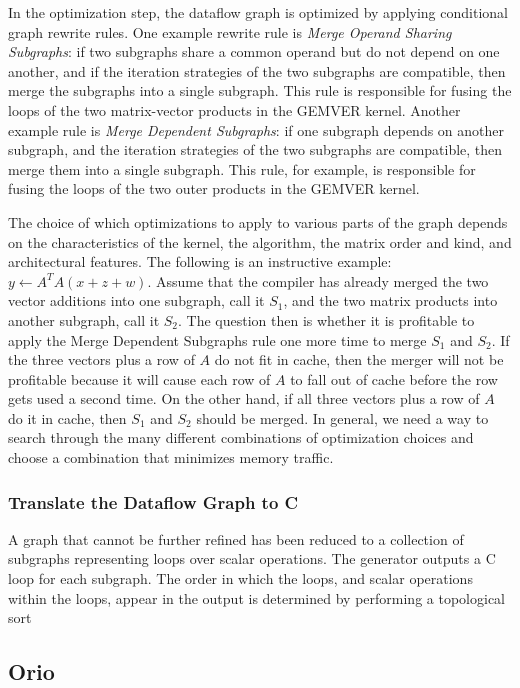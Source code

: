 \documentclass[11pt]{article}
\begin{document}
In the optimization step, the dataflow graph is optimized by applying conditional graph rewrite rules.  One example rewrite rule is \emph{Merge Operand Sharing Subgraphs}: if two subgraphs share a common operand but do not depend on one another, and if the iteration strategies of the two subgraphs are compatible, then merge the subgraphs into a single subgraph.  This rule is responsible for fusing the loops of the two matrix-vector products in the GEMVER kernel.  Another example rule is \emph{Merge Dependent Subgraphs}: if one subgraph depends on another subgraph, and the iteration strategies of the two subgraphs are compatible, then merge them into a single subgraph.  This rule, for example, is responsible for fusing the loops of the two outer products in the GEMVER kernel.

The choice of which optimizations to apply to various parts of the graph depends on the characteristics of the kernel, the algorithm, the matrix order and kind, and architectural features.  The following is an instructive example: $y \gets A^T A (x + z + w)$.  Assume that the compiler has already merged the two vector additions into one subgraph, call it $S_1$, and the two matrix products into another subgraph, call it $S_2$. The question then is whether it is profitable to apply the Merge Dependent Subgraphs rule one more time to merge $S_1$ and $S_2$. If the three vectors plus a row of $A$ do not fit in cache, then the merger will not be profitable because it will cause each row of $A$ to fall out of cache before the row gets used a second time.  On the other hand, if all three vectors plus a row of $A$ do it in cache, then $S_1$ and $S_2$ should be merged.  In general, we need a way to search through the many different combinations of optimization choices and choose a combination that minimizes memory traffic.

\subsubsection{Translate the Dataflow Graph to C}

A graph that cannot be further refined has been reduced to a collection of subgraphs representing loops over scalar operations. The generator outputs a C loop for each subgraph.  The order in which the loops, and scalar operations within the loops, appear in the output is determined by performing a topological sort
\subsection{Orio}
\label{sec:orio}
\end{document}
